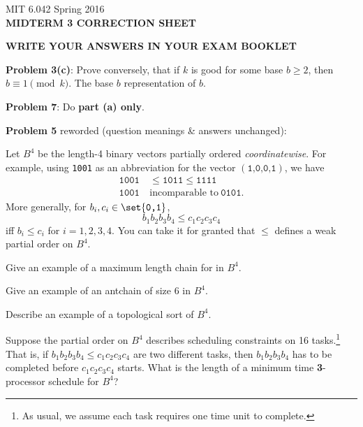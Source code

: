\documentclass[handout]{mcs}
\begin{document}

\begin{center}
MIT 6.042 Spring 2016\\
\textbf{MIDTERM 3 CORRECTION SHEET}
\end{center}

\begin{center}
\textbf{WRITE YOUR ANSWERS IN YOUR EXAM BOOKLET}
\end{center}

\bigskip

\textbf{Problem 3(c)}: Prove conversely, that if $k$ is good for some base $b
\geq 2$, then $b \equiv 1 \pmod k$.  \hint The base $b$ representation
of $b$.
\bigskip

\textbf{Problem 7}: Do \textbf{ part (a) only}.
\bigskip

\textbf{Problem 5} reworded (question meanings \& answers unchanged):

\medskip
Let $B^4$ be the length-4 binary vectors partially ordered
\emph{coordinatewise}. For example, using \texttt{1001} as an
abbreviation for the vector $(\texttt{1,0,0,1})$, we have
\begin{align*}
\texttt{1001}  & \leq \texttt{1011} \leq \texttt{1111}\\
\texttt{1001}\ & \text{incomparable to}\ \texttt{0101}.
\end{align*}
More generally, for $b_i,c_i \in \set{\texttt{0,1}}$,
\[
b_1b_2b_3b_4 \leq c_1c_2c_3c_4
\]
iff $b_i \leq c_i$ for $i= 1,2,3,4$.  You can take it for granted that
$\leq$ defines a weak partial order on $B^4$.

\bparts

\ppart Give an example of a maximum length chain for in $B^4$.

\ppart Give an example of an antchain of size 6 in $B^4$.

\ppart Describe an example of a topological sort of $B^4$.

\ppart Suppose the partial order on $B^4$ describes scheduling
constraints on 16 tasks.\footnote{As usual, we assume each task
  requires one time unit to complete.}  That is, if $b_1b_2b_3b_4 \leq
c_1c_2c_3c_4$ are two different tasks, then $b_1b_2b_3b_4$ has to be
completed before $c_1c_2c_3c_4$ starts.  What is the length of a
minimum time \textbf{3}-processor schedule for $B^4$?

\eparts
\end{document}

